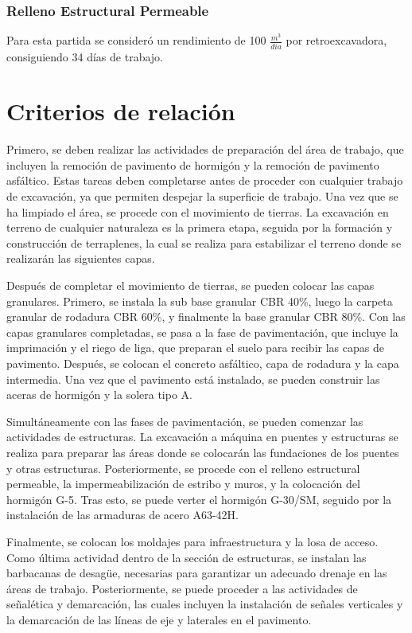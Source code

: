 \documentclass{article} %
\begin{document}
\subsubsection{Relleno Estructural Permeable}
Para esta partida se consideró un rendimiento de 100 $\frac{m^3}{dia}$ por retroexcavadora, consiguiendo 34 días de trabajo.



\newpage
\section{Criterios de relación}

Primero, se deben realizar las actividades de preparación del área de trabajo, que incluyen la remoción de pavimento de hormigón y la remoción de pavimento asfáltico. Estas tareas deben completarse antes de proceder con cualquier trabajo de excavación, ya que permiten despejar la superficie de trabajo. Una vez que se ha limpiado el área, se procede con el movimiento de tierras. La excavación en terreno de cualquier naturaleza es la primera etapa, seguida por la formación y construcción de terraplenes, la cual se realiza para estabilizar el terreno donde se realizarán las siguientes capas.

Después de completar el movimiento de tierras, se pueden colocar las capas granulares. Primero, se instala la sub base granular CBR 40\%, luego la carpeta granular de rodadura CBR 60\%, y finalmente la base granular CBR 80\%. Con las capas granulares completadas, se pasa a la fase de pavimentación, que incluye la imprimación y el riego de liga, que preparan el suelo para recibir las capas de pavimento. Después, se colocan el concreto asfáltico, capa de rodadura y la capa intermedia. Una vez que el pavimento está instalado, se pueden construir las aceras de hormigón y la solera tipo A.

Simultáneamente con las fases de pavimentación, se pueden comenzar las actividades de estructuras. La excavación a máquina en puentes y estructuras se realiza para preparar las áreas donde se colocarán las fundaciones de los puentes y otras estructuras. Posteriormente, se procede con el relleno estructural permeable, la impermeabilización de estribo y muros, y la colocación del hormigón G-5. Tras esto, se puede verter el hormigón G-30/SM, seguido por la instalación de las armaduras de acero A63-42H.

Finalmente, se colocan los moldajes para infraestructura y la losa de acceso. Como última actividad dentro de la sección de estructuras, se instalan las barbacanas de desagüe, necesarias para garantizar un adecuado drenaje en las áreas de trabajo. Posteriormente, se puede proceder a las actividades de señalética y demarcación, las cuales incluyen la instalación de señales verticales y la demarcación de las líneas de eje y laterales en el pavimento.
\end{document}
